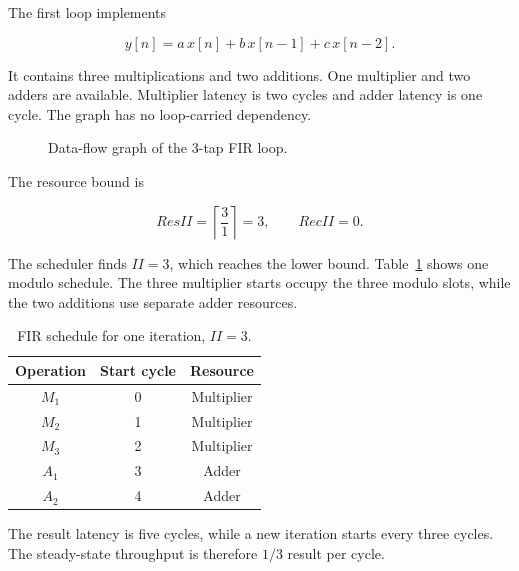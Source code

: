 \documentclass[conference]{IEEEtran}
\begin{document}
The first loop implements

\begin{equation}
y[n]=a\,x[n]+b\,x[n-1]+c\,x[n-2].
\end{equation}

It contains three multiplications and two additions. One multiplier and two adders
are available. Multiplier latency is two cycles and adder latency is one cycle.
The graph has no loop-carried dependency.

\begin{figure}[t]
\centering
{}
\caption{Data-flow graph of the 3-tap FIR loop.}
\label{fig:fir}
\end{figure}

The resource bound is

\begin{equation}
ResII=\left\lceil\frac{3}{1}\right\rceil=3,
\qquad RecII=0.
\end{equation}

The scheduler finds $II=3$, which reaches the lower bound. Table~\ref{tab:fir}
shows one modulo schedule. The three multiplier starts occupy the three modulo
slots, while the two additions use separate adder resources.

\begin{table}[t]
\centering
\caption{FIR schedule for one iteration, $II=3$.}
\label{tab:fir}
\begin{tabular}{@{}ccc@{}}
\toprule
Operation & Start cycle & Resource\\
\midrule
$M_1$ & 0 & Multiplier\\
$M_2$ & 1 & Multiplier\\
$M_3$ & 2 & Multiplier\\
$A_1$ & 3 & Adder\\
$A_2$ & 4 & Adder\\
\bottomrule
\end{tabular}
\end{table}

The result latency is five cycles, while a new iteration starts every three
cycles. The steady-state throughput is therefore $1/3$ result per cycle.
\end{document}
